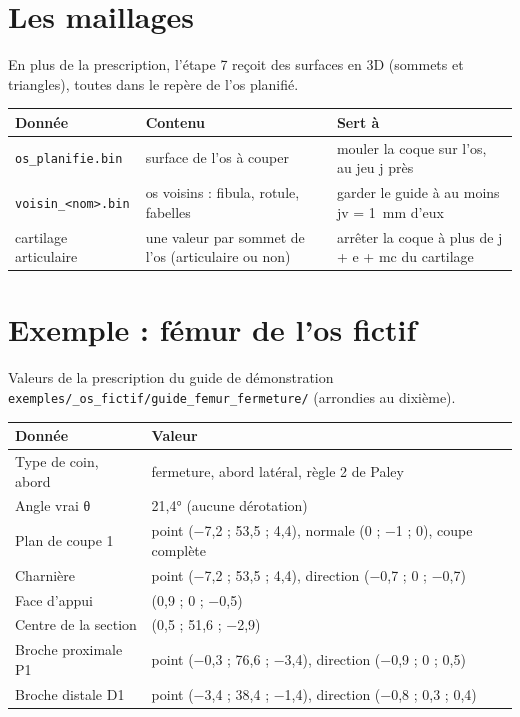 \documentclass[11pt,a4paper]{article}
\newcommand{\champ}[1]{\texttt{\small #1}}
\begin{document}
\section{Les maillages}

En plus de la prescription, l'étape 7 reçoit des surfaces en 3D (sommets et triangles), toutes dans le repère de
l'os planifié.

\begin{tabularx}{\textwidth}{@{}lXX@{}}
\toprule
\textbf{Donnée} & \textbf{Contenu} & \textbf{Sert à} \\ \midrule
\champ{os\_planifie.bin} & surface de l'os à couper & mouler la coque sur l'os, au jeu j près \\
\champ{voisin\_<nom>.bin} & os voisins : fibula, rotule, fabelles & garder le guide à au moins jv = 1~mm d'eux \\
cartilage articulaire & une valeur par sommet de l'os (articulaire ou non) & arrêter la coque à plus de j + e + mc du cartilage \\
\bottomrule
\end{tabularx}

\section{Exemple : fémur de l'os fictif}

Valeurs de la prescription du guide de démonstration\\ \champ{exemples/\_os\_fictif/guide\_femur\_fermeture/}
(arrondies au dixième).

\begin{tabularx}{\textwidth}{@{}lX@{}}
\toprule
\textbf{Donnée} & \textbf{Valeur} \\ \midrule
Type de coin, abord & fermeture, abord latéral, règle 2 de Paley \\
Angle vrai θ & 21,4° (aucune dérotation) \\
Plan de coupe 1 & point (−7,2 ; 53,5 ; 4,4), normale (0 ; −1 ; 0), coupe complète \\
Charnière & point (−7,2 ; 53,5 ; 4,4), direction (−0,7 ; 0 ; −0,7) \\
Face d'appui & (0,9 ; 0 ; −0,5) \\
Centre de la section & (0,5 ; 51,6 ; −2,9) \\
Broche proximale P1 & point (−0,3 ; 76,6 ; −3,4), direction (−0,9 ; 0 ; 0,5) \\
Broche distale D1 & point (−3,4 ; 38,4 ; −1,4), direction (−0,8 ; 0,3 ; 0,4) \\
\bottomrule
\end{tabularx}
\end{document}
